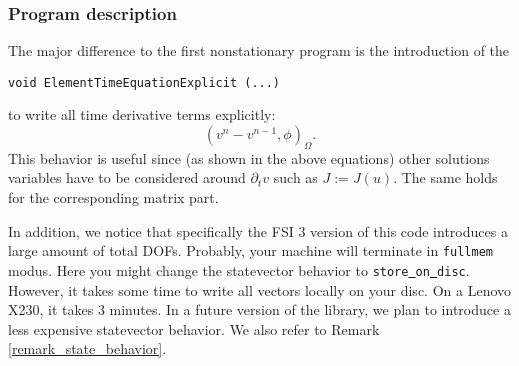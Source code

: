 \subsubsection{Program description}

The major difference to the first nonstationary program
is the introduction of the 
\begin{verbatim}
void ElementTimeEquationExplicit (...) 
\end{verbatim}
to write all time derivative terms explicitly:
\begin{equation*}
(v^n - v^{n-1}, \phi)_{\Omega}.
\end{equation*}
This behavior is useful since (as shown in the above equations)
other solutions variables have to be considered
around $\partial_t v$ such as $J:=J(u)$. 
The same holds for the corresponding matrix part.

In addition, we notice that specifically the FSI 3 version of this 
code introduces a large amount of total DOFs. Probably, your machine 
will terminate in \texttt{fullmem} modus. Here you might change the 
statevector behavior to \texttt{store\underline{ }on\underline{ }disc}.
However, it takes some time to write all vectors locally on your disc.
On a Lenovo X230, it takes $3$ minutes. In a future version of the library,
we plan to introduce a less expensive statevector behavior.
We also refer to Remark \ref{remark_state_behavior}.

\vspace{0.2cm}
